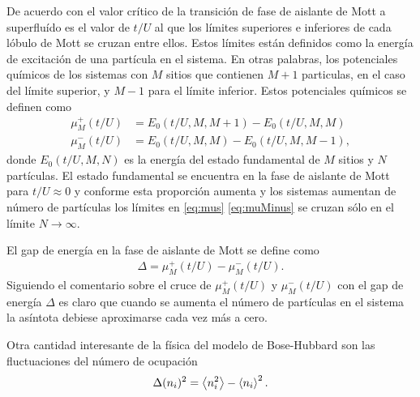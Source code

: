 \documentclass[11pt,letterpaper]{article}
\begin{document}
De acuerdo con \cite{Raventos} el valor crítico de la transición de 
fase de aislante de Mott a superfluído es el valor de $t/U$ al que
los límites superiores e inferiores de cada lóbulo de Mott se cruzan
entre ellos. Estos límites están definidos como la energía de excitación
de una partícula en el sistema. En otras palabras, los potenciales 
químicos de los sistemas con $M$ sitios que contienen $M+1$ particulas,
en el caso del límite superior, y $M-1$ para el límite inferior.
Estos potenciales químicos se definen como
\begin{align}\label{eq:mus}
\mu_M^+(t/U)&=E_0(t/U,M,M+1)-E_0(t/U,M,M)\\
\mu_M^-(t/U)&=E_0(t/U,M,M)-E_0(t/U,M,M-1),\label{eq:muMinus}
\end{align}
donde $E_0(t/U,M,N)$ es la energía del estado fundamental de $M$ sitios
y $N$ partículas. El estado fundamental se encuentra en la fase 
de aislante de Mott para $t/U\approx 0$ y conforme esta proporción 
aumenta y los sistemas aumentan de número de partículas los límites
en \eqref{eq:mus} \eqref{eq:muMinus} se cruzan sólo en el límite $N\to \infty$.

El gap de energía en la fase de aislante de Mott se define como
\begin{align}\label{eq:gap}
\Delta = \mu_M^+(t/U)-\mu_M^-(t/U).
\end{align}
Siguiendo el comentario sobre el cruce de $\mu_M^+(t/U)$ y $\mu_M^-(t/U)$
con el gap de energía $\Delta$ es claro que cuando se aumenta el 
número de partículas en el sistema la asíntota debiese aproximarse 
cada vez más a cero.

Otra cantidad interesante de la física del modelo de Bose-Hubbard son
las fluctuaciones del número de ocupación
\begin{align}\label{eq:fluctuaciones}
\Delta(n_i)^2=\expval{n_i^2}-\expval{n_i}^2.
\end{align}
\end{document}
